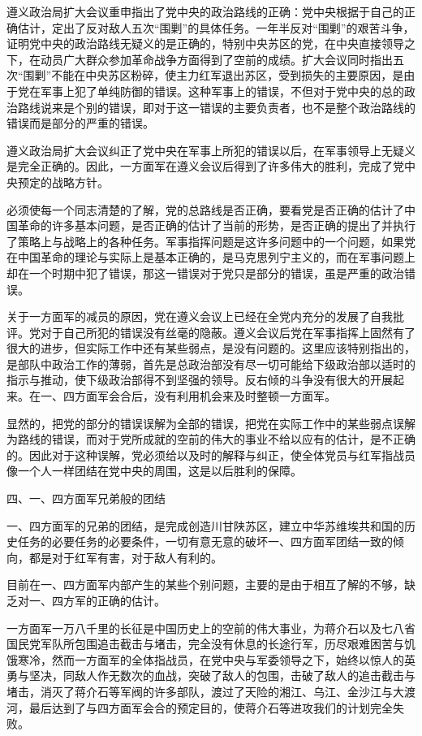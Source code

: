 遵义政治局扩大会议重申指出了党中央的政治路线的正确：党中央根据于自己的正确估计，定出了反对敌人五次“围剿”的具体任务。一年半反对“围剿”的艰苦斗争，证明党中央的政治路线无疑义的是正确的，特别中央苏区的党，在中央直接领导之下，在动员广大群众参加革命战争方面得到了空前的成绩。扩大会议同时指出五次“围剿”不能在中央苏区粉碎，使主力红军退出苏区，受到损失的主要原因，是由于党在军事上犯了单纯防御的错误。这种军事上的错误，不但对于党中央的总的政治路线说来是个别的错误，即对于这一错误的主要负责者，也不是整个政治路线的错误而是部分的严重的错误。

遵义政治局扩大会议纠正了党中央在军事上所犯的错误以后，在军事领导上无疑义是完全正确的。因此，一方面军在遵义会议后得到了许多伟大的胜利，完成了党中央预定的战略方针。

必须使每一个同志清楚的了解，党的总路线是否正确，要看党是否正确的估计了中国革命的许多基本问题，是否正确的估计了当前的形势，是否正确的提出了并执行了策略上与战略上的各种任务。军事指挥问题是这许多问题中的一个问题，如果党在中国革命的理论与实际上是基本正确的，是马克思列宁主义的，而在军事问题上却在一个时期中犯了错误，那这一错误对于党只是部分的错误，虽是严重的政治错误。

关于一方面军的减员的原因，党在遵义会议上已经在全党内充分的发展了自我批评。党对于自己所犯的错误没有丝毫的隐蔽。遵义会议后党在军事指挥上固然有了很大的进步，但实际工作中还有某些弱点，是没有问题的。这里应该特别指出的，是部队中政治工作的薄弱，首先是总政治部没有尽一切可能给下级政治部以适时的指示与推动，使下级政治部得不到坚强的领导。反右倾的斗争没有很大的开展起来。在一、四方面军会合后，没有利用机会来及时整顿一方面军。

显然的，把党的部分的错误误解为全部的错误，把党在实际工作中的某些弱点误解为路线的错误，而对于党所成就的空前的伟大的事业不给以应有的估计，是不正确的。因此对于这种误解，党必须给以及时的解释与纠正，使全体党员与红军指战员像一个人一样团结在党中央的周围，这是以后胜利的保障。

四、一、四方面军兄弟般的团结

一、四方面军的兄弟的团结，是完成创造川甘陕苏区，建立中华苏维埃共和国的历史任务的必要任务的必要条件，一切有意无意的破坏一、四方面军团结一致的倾向，都是对于红军有害，对于敌人有利的。

目前在一、四方面军内部产生的某些个别问题，主要的是由于相互了解的不够，缺乏对一、四方军的正确的估计。

一方面军一万八千里的长征是中国历史上的空前的伟大事业，为蒋介石以及七八省国民党军队所包围追击截击与堵击，完全没有休息的长途行军，历尽艰难困苦与饥饿寒冷，然而一方面军的全体指战员，在党中央与军委领导之下，始终以惊人的英勇与坚决，同敌人作无数次的血战，突破了敌人的包围，击破了敌人的追击截击与堵击，消灭了蒋介石等军阀的许多部队，渡过了天险的湘江、乌江、金沙江与大渡河，最后达到了与四方面军会合的预定目的，使蒋介石等进攻我们的计划完全失败。

